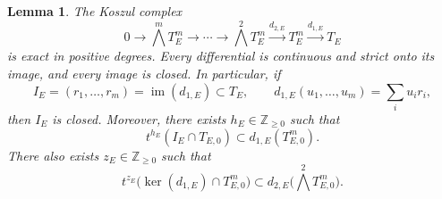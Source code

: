 \documentclass[11pt,reqno]{amsart}
\newtheorem{lemma}[lemma]{Lemma}
\theoremstyle{definition}
\newcommand{\im}{\operatorname{im}}
\begin{document}
\begin{lemma}\label{lem:koszul}
The Koszul complex
\[
  0\longrightarrow \bigwedge^mT_E^m\longrightarrow\cdots
  \longrightarrow\bigwedge^2T_E^m\xrightarrow{d_{2,E}}
  T_E^m\xrightarrow{d_{1,E}}T_E
\]
is exact in positive degrees.  Every differential is continuous and strict onto
its image, and every image is closed.  In particular, if
\[
  I_E=(r_1,\ldots,r_m)=\im(d_{1,E})\subset T_E,
  \qquad
  d_{1,E}(u_1,\ldots,u_m)=\sum_i u_ir_i,
\]
then $I_E$ is closed.  Moreover, there exists
$h_E\in\mathbb Z_{\geq0}$ such that
\begin{equation}\label{eq:ideal-denominators}
  t^{h_E}(I_E\cap T_{E,0})
  \subset d_{1,E}(T_{E,0}^m).
\end{equation}
There also exists $z_E\in\mathbb Z_{\geq0}$ such that
\begin{equation}\label{eq:syzygy-denominators}
  t^{z_E}\bigl(\ker(d_{1,E})\cap T_{E,0}^m\bigr)
  \subset d_{2,E}\bigl(\textstyle\bigwedge^2 T_{E,0}^m\bigr).
\end{equation}
\end{lemma}
\end{document}
